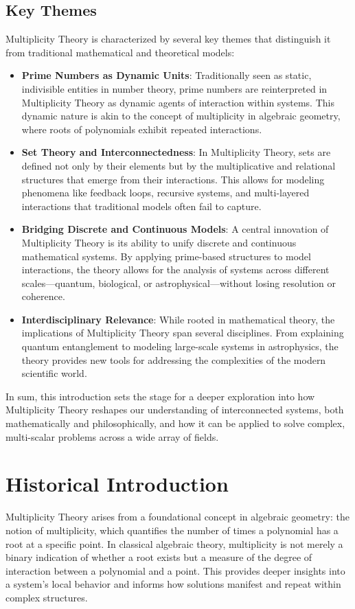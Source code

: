 \documentclass[12pt]{article}
\begin{document}
\subsection{Key Themes}
Multiplicity Theory is characterized by several key themes that distinguish it from traditional mathematical and theoretical models:
\begin{itemize}
    \item \textbf{Prime Numbers as Dynamic Units}: Traditionally seen as static, indivisible entities in number theory, prime numbers are reinterpreted in Multiplicity Theory as dynamic agents of interaction within systems. This dynamic nature is akin to the concept of multiplicity in algebraic geometry, where roots of polynomials exhibit repeated interactions.
    \item \textbf{Set Theory and Interconnectedness}: In Multiplicity Theory, sets are defined not only by their elements but by the multiplicative and relational structures that emerge from their interactions. This allows for modeling phenomena like feedback loops, recursive systems, and multi-layered interactions that traditional models often fail to capture.
    \item \textbf{Bridging Discrete and Continuous Models}: A central innovation of Multiplicity Theory is its ability to unify discrete and continuous mathematical systems. By applying prime-based structures to model interactions, the theory allows for the analysis of systems across different scales—quantum, biological, or astrophysical—without losing resolution or coherence.
    \item \textbf{Interdisciplinary Relevance}: While rooted in mathematical theory, the implications of Multiplicity Theory span several disciplines. From explaining quantum entanglement to modeling large-scale systems in astrophysics, the theory provides new tools for addressing the complexities of the modern scientific world.
\end{itemize}
In sum, this introduction sets the stage for a deeper exploration into how Multiplicity Theory reshapes our understanding of interconnected systems, both mathematically and philosophically, and how it can be applied to solve complex, multi-scalar problems across a wide array of fields.

\section{Historical Introduction}

Multiplicity Theory arises from a foundational concept in algebraic geometry: the notion of multiplicity, which quantifies the number of times a polynomial has a root at a specific point. In classical algebraic theory, multiplicity is not merely a binary indication of whether a root exists but a measure of the degree of interaction between a polynomial and a point. This provides deeper insights into a system's local behavior and informs how solutions manifest and repeat within complex structures.
\end{document}
